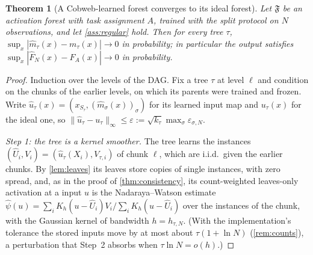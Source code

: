 \documentclass[11pt]{article}
\newtheorem{theorem}{Theorem}
\theoremstyle{definition}
\theoremstyle{remark}
\newcommand{\F}{\mathfrak{F}}
\begin{document}
\begin{theorem}[A Cobweb-learned forest converges to its ideal forest]\label{thm:ideal}
Let $\F$ be an activation forest with task assignment $A$, trained with the split
protocol on $N$ observations, and let \cref{ass:regular} hold.  Then for every tree
$\tau$, $\sup_x|\hat m_\tau(x)-m_\tau(x)|\to0$ in probability; in particular the output
satisfies $\sup_x|\hat F_N(x)-F_A(x)|\to0$ in probability.
\end{theorem}
\begin{proof}
Induction over the levels of the DAG.  Fix a tree $\tau$ at level $\ell$ and condition on
the chunks of the earlier levels, on which its parents were trained and frozen.  Write
$\hat u_\tau(x)=(x_{S_\tau},(\hat m_\sigma(x))_\sigma)$ for its learned input map and
$u_\tau(x)$ for the ideal one, so $\|\hat u_\tau-u_\tau\|_\infty\le\varepsilon:=
\sqrt{k_\tau}\max_\sigma\varepsilon_{\sigma,N}$.

\emph{Step 1: the tree is a kernel smoother.}  The tree learns the instances
$(\hat U_i,V_i)=(\hat u_\tau(X_i),V_{\tau,i})$ of chunk $\ell$, which are i.i.d.\ given
the earlier chunks.  By \cref{lem:leaves} its leaves store copies of single instances,
with zero spread, and, as in the proof of \cref{thm:consistency}, its count-weighted
leaves-only activation at a input $u$ is the Nadaraya--Watson estimate
$\hat\psi(u)=\sum_iK_h(u-\hat U_i)V_i/\sum_iK_h(u-\hat U_i)$ over the instances of the
chunk, with the Gaussian kernel of bandwidth $h=h_{\tau,N}$.  (With the implementation's
tolerance the stored inputs move by at most about $\tau(1+\ln N)$ (\cref{rem:counts}), a
perturbation that Step~2 absorbs when $\tau\ln N=o(h)$.)


\end{proof}
\end{document}
